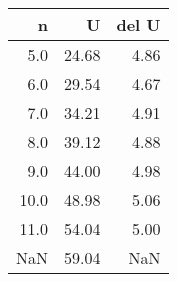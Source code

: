 \begin{tabular}{rrr}
\toprule
   n &     U &  del U \\
\midrule
 5.0 & 24.68 &   4.86 \\
 6.0 & 29.54 &   4.67 \\
 7.0 & 34.21 &   4.91 \\
 8.0 & 39.12 &   4.88 \\
 9.0 & 44.00 &   4.98 \\
10.0 & 48.98 &   5.06 \\
11.0 & 54.04 &   5.00 \\
 NaN & 59.04 &    NaN \\
\bottomrule
\end{tabular}

